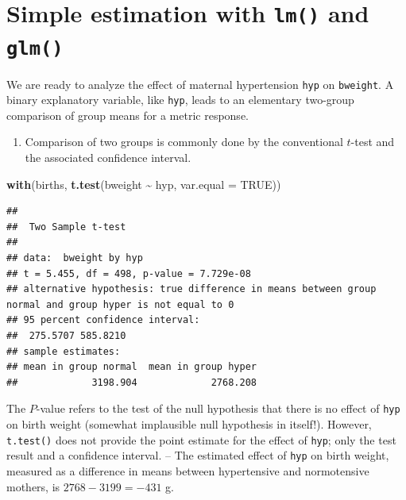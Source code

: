 \documentclass[
]{book}
\newenvironment{Shaded}{\begin{snugshade}}{\end{snugshade}}
\newcommand{\AttributeTok}[1]{\textcolor[rgb]{0.13,0.29,0.53}{#1}}
\newcommand{\ConstantTok}[1]{\textcolor[rgb]{0.56,0.35,0.01}{#1}}
\newcommand{\FunctionTok}[1]{\textcolor[rgb]{0.13,0.29,0.53}{\textbf{#1}}}
\newcommand{\NormalTok}[1]{#1}
\newcommand{\SpecialCharTok}[1]{\textcolor[rgb]{0.81,0.36,0.00}{\textbf{#1}}}
\providecommand{\tightlist}{%
  \setlength{\itemsep}{0pt}\setlength{\parskip}{0pt}}
\theoremstyle{definition}
\theoremstyle{definition}
\theoremstyle{definition}
\theoremstyle{definition}
\theoremstyle{remark}
\begin{document}
\section{\texorpdfstring{Simple estimation with \texttt{lm()} and \texttt{glm()}}{Simple estimation with lm() and glm()}}\label{simple-estimation-with-lm-and-glm}

We are ready to analyze the effect of maternal hypertension \texttt{hyp} on \texttt{bweight}.
A binary explanatory variable, like \texttt{hyp}, leads to an elementary
two-group comparison of group
means for a metric response.

\begin{enumerate}
\def\labelenumi{\arabic{enumi}.}
\tightlist
\item
  Comparison of two groups is commonly done by the conventional \(t\)-test and
  the associated confidence interval.
\end{enumerate}

\begin{Shaded}
\begin{Highlighting}[]
\FunctionTok{with}\NormalTok{(births, }\FunctionTok{t.test}\NormalTok{(bweight }\SpecialCharTok{\textasciitilde{}}\NormalTok{ hyp, }\AttributeTok{var.equal =} \ConstantTok{TRUE}\NormalTok{))}
\end{Highlighting}
\end{Shaded}

\begin{verbatim}
## 
##  Two Sample t-test
## 
## data:  bweight by hyp
## t = 5.455, df = 498, p-value = 7.729e-08
## alternative hypothesis: true difference in means between group normal and group hyper is not equal to 0
## 95 percent confidence interval:
##  275.5707 585.8210
## sample estimates:
## mean in group normal  mean in group hyper 
##             3198.904             2768.208
\end{verbatim}

The \(P\)-value refers to the test
of the null hypothesis that there is no effect of \texttt{hyp} on birth weight
(somewhat implausible null hypothesis in itself!).
However, \texttt{t.test()} does not provide
the point estimate for the effect of \texttt{hyp}; only the test result and a confidence interval. -- The estimated effect of \texttt{hyp} on birth weight,
measured as a difference in means between hypertensive and normotensive
mothers, is \(2768-3199 = -431\) g.
\end{document}
